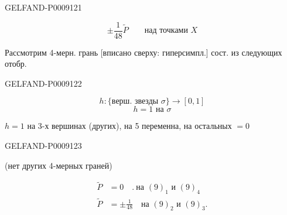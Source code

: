 \begin{GelfandAdjacentEvidence}{GELFAND-P000912}{1}

\begin{equation*}
 \pm\frac{1}{48}\widetilde P
 \qquad\text{над точками }X
\end{equation*}

Рассмотрим 4-мерн. грань [вписано сверху: гиперсимпл.] сост. из следующих отобр.
\end{GelfandAdjacentEvidence}
\begin{GelfandAdjacentEvidence}{GELFAND-P000912}{2}

\begin{equation*}
 h:\{\text{верш. звезды }\sigma\}\longrightarrow[0,1]
\end{equation*}
\begin{equation*}
 h=1\text{ на }\sigma
\end{equation*}

$h=1$ на 3-х вершинах (других), на 5 переменна, на остальных $=0$

\end{GelfandAdjacentEvidence}
\begin{GelfandAdjacentEvidence}{GELFAND-P000912}{3}


(нет других 4-мерных граней)

\begin{align*}
 \widetilde P&=0\quad .\ \text{на }(9)_1\text{ и }(9)_4\\
 \widetilde P&=\pm\frac{1}{48}\quad\text{на }(9)_2\text{ и }(9)_3.
\end{align*}
\end{GelfandAdjacentEvidence}
